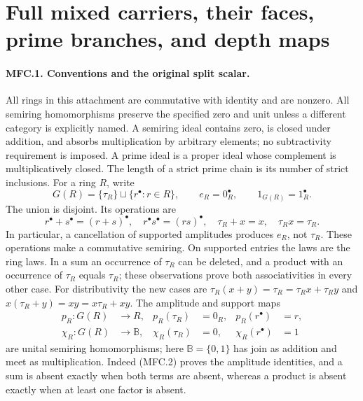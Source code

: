 \providecommand{\Chi}{\mathrm{X}}
\section{Full mixed carriers, their faces, prime branches, and depth maps}
\label{sec:MFC}

\paragraph{MFC.1. Conventions and the original split scalar.}
All rings in this attachment are commutative with identity and are nonzero.
All semiring homomorphisms preserve the specified zero and unit unless a
different category is explicitly named. A semiring ideal contains zero, is
closed under addition, and absorbs multiplication by arbitrary elements;
no subtractivity requirement is imposed. A prime ideal is a proper ideal
whose complement is multiplicatively closed. The length of a strict prime
chain is its number of strict inclusions.
For a ring \(R\), write
\[
 G(R)=\{\tau_R\}\sqcup\{r^\bullet:r\in R\},\qquad
 e_R=0_R^\bullet,\qquad 1_{G(R)}=1_R^\bullet.                 \tag{MFC.1}
\]
The union is disjoint. Its operations are
\[
 r^\bullet+s^\bullet=(r+s)^\bullet,\quad
 r^\bullet s^\bullet=(rs)^\bullet,\quad
 \tau_R+x=x,\quad \tau_Rx=\tau_R.
                                                               \tag{MFC.2}
\]
In particular, a cancellation of supported amplitudes produces \(e_R\),
not \(\tau_R\).
These operations make a commutative semiring. On supported entries the
laws are the ring laws. In a sum an occurrence of \(\tau_R\) can be deleted,
and a product with an occurrence of \(\tau_R\) equals \(\tau_R\); these
observations prove both associativities in every other case. For
distributivity the new cases are
\(\tau_R(x+y)=\tau_R=\tau_Rx+\tau_Ry\) and
\(x(\tau_R+y)=xy=x\tau_R+xy\).
The amplitude and support maps
\[
 \begin{aligned}
 p_R:G(R)&\longrightarrow R,&
 p_R(\tau_R)&=0_R,& p_R(r^\bullet)&=r,\\
 \chi_R:G(R)&\longrightarrow\mathbb B,&
 \chi_R(\tau_R)&=0,&\chi_R(r^\bullet)&=1
 \end{aligned}                                           \tag{MFC.3}
\]
are unital semiring homomorphisms; here
\(\mathbb B=\{0,1\}\) has join as addition and meet as multiplication.
Indeed (MFC.2) proves the amplitude identities, and a sum is absent
exactly when both terms are absent, whereas a product is absent exactly
when at least one factor is absent.

